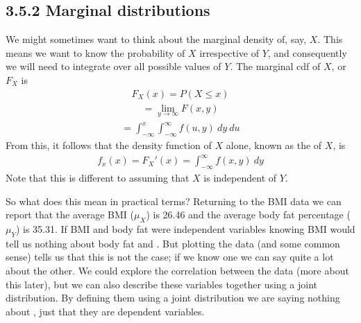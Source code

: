 \documentclass[letterpaper,10pt,english]{jupyterBook}
\begin{document}
\subsection{3.5.2 Marginal distributions}
\label{\detokenize{03.f. Continuous Probability Distributions:marginal-distributions}}
\sphinxAtStartPar
We might sometimes want to think about the marginal density of, say, \(X\). This means we want to know the probability of \(X\) irrespective of \(Y\), and consequently we will need to integrate over all possible values of \(Y\). The marginal cdf of \(X\), or \(F_X\) is
\begin{equation*}
\begin{split}F_X (x) = P(X \leq x)\end{split}
\end{equation*}\begin{equation*}
\begin{split} = \lim_{y \rightarrow \infty} F(x,y)\end{split}
\end{equation*}\begin{equation*}
\begin{split} = \int_{-\infty}^{x} \int_{-\infty}^{\infty} f(u,y)\: dy\: du\end{split}
\end{equation*}
\sphinxAtStartPar
From this, it follows that the density function of \(X\) alone, known as the  of \(X\), is
\begin{equation*}
\begin{split}f_x (x) = F_{X}'(x) = \int_{-\infty}^{\infty} f(x,y)\: dy\end{split}
\end{equation*}
\sphinxAtStartPar
Note that this is different to assuming that \(X\) is independent of \(Y\).

\sphinxAtStartPar
So what does this mean in practical terms? Returning to the BMI data we can report that the average BMI (\(\mu_X\)) is 26.46 and the average body fat percentage (\(\mu_Y\)) is 35.31. If BMI and body fat were independent variables knowing BMI would tell us nothing about body fat and . But plotting the data (and some common sense) tells us that this is not the case; if we know one we can say quite a lot about the other. We could explore the correlation between the data (more about this later), but we can also describe these variables together using a joint distribution. By defining them using a joint distribution we are saying nothing about , just that they are dependent variables.
\end{document}
